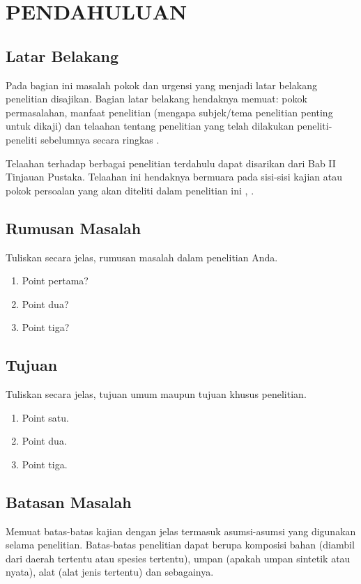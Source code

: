 \chapter{PENDAHULUAN}
\section{Latar Belakang}
Pada bagian ini masalah pokok dan urgensi yang menjadi latar belakang penelitian disajikan. Bagian latar belakang hendaknya memuat: pokok permasalahan, manfaat penelitian (mengapa subjek/tema penelitian penting untuk dikaji) dan telaahan tentang penelitian yang telah dilakukan peneliti-peneliti sebelumnya secara ringkas \cite{anarticle}.

Telaahan terhadap berbagai penelitian terdahulu dapat disarikan dari Bab II Tinjauan Pustaka. Telaahan ini hendaknya bermuara pada sisi-sisi kajian atau pokok persoalan yang akan diteliti dalam penelitian ini \cite{anarticle}, \cite{website}.

\section{Rumusan Masalah}
Tuliskan secara jelas, rumusan masalah dalam penelitian Anda.
\begin{enumerate}
	\item 
	Point pertama?
	\item
	Point dua?
	\item
	Point tiga?
\end{enumerate}
\section{Tujuan}
Tuliskan secara jelas, tujuan umum maupun tujuan khusus penelitian.
\begin{enumerate}
	\item 
	Point satu.
	\item
	Point dua.
	\item
	Point tiga.
\end{enumerate}
\section{Batasan Masalah}
Memuat batas-batas kajian dengan jelas termasuk asumsi-asumsi yang digunakan selama penelitian. Batas-batas penelitian dapat berupa komposisi bahan (diambil dari daerah tertentu atau spesies tertentu), umpan (apakah umpan sintetik atau nyata), alat (alat jenis tertentu) dan sebagainya.
